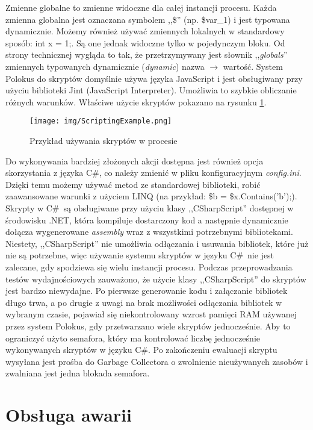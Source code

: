 \documentclass[declaration,shortabstract,mgr]{iithesis}
\newcommand{\cs}{C\#}
\begin{document}
Zmienne globalne to zmienne widoczne dla całej instancji procesu. Każda zmienna globalna jest oznaczana symbolem ,,\$'' (np. \$var\_1) i jest typowana dynamicznie. Możemy również używać zmiennych lokalnych w standardowy sposób: int x = 1;. Są one jednak widoczne tylko w pojedynczym bloku. Od strony technicznej wygląda to tak, że przetrzymywany jest słownik ,,\textit{globals}'' zmiennych typowanych dynamicznie (\textit{dynamic}) nazwa $\rightarrow$ wartość. System Polokus do skryptów domyślnie używa języka JavaScript i jest obsługiwany przy użyciu biblioteki Jint (JavaScript Interpreter). Umożliwia to szybkie obliczanie różnych warunków. Właściwe użycie skryptów pokazano na rysunku \ref{fig:process-example-scripts}.

\begin{figure}[H]
    \texttt{[image: img/ScriptingExample.png]}
    \caption{Przykład używania skryptów w procesie}
    \label{fig:process-example-scripts}
\end{figure}

Do wykonywania bardziej złożonych akcji dostępna jest również opcja skorzystania z języka \cs, co należy zmienić w pliku konfiguracyjnym \textit{config.ini}. Dzięki temu możemy używać metod ze standardowej biblioteki, robić zaawansowane warunki z użyciem LINQ (na przykład: \$b = \$x.Contains('b');). Skrypty w \cs\ są obsługiwane przy użyciu klasy ,,CSharpScript'' dostępnej w środowisku .NET, która kompiluje dostarczony kod a następnie dynamicznie dołącza wygenerowane \textit{assembly} wraz z wszystkimi potrzebnymi bibliotekami. Niestety, ,,CSharpScript'' nie umożliwia odłączania i usuwania bibliotek, które już nie są potrzebne, więc używanie systemu skryptów w języku \cs\ nie jest zalecane, gdy spodziewa się wielu instancji procesu. Podczas przeprowadzania testów wydajnościowych zauważono, że użycie klasy ,,CSharpScript'' do skryptów jest bardzo niewydajne. Po pierwsze generowanie kodu i załączanie bibliotek długo trwa, a po drugie z uwagi na brak możliwości odłączania bibliotek w wybranym czasie, pojawiał się niekontrolowany wzrost pamięci RAM używanej przez system Polokus, gdy przetwarzano wiele skryptów jednocześnie. Aby to ograniczyć użyto semafora, który ma kontrolować liczbę jednocześnie wykonywanych skryptów w języku \cs. Po zakończeniu ewaluacji skryptu wysyłana jest prośba do Garbage Collectora o zwolnienie nieużywanych zasobów i zwalniana jest jedna blokada semafora.

\section{Obsługa awarii}
\end{document}

